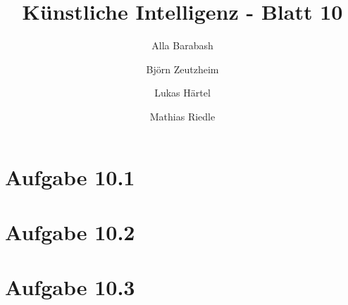 \documentclass[german,a4paper]{scrartcl}
\title{Künstliche Intelligenz - Blatt 10}
\author{Alla Barabash \and Björn Zeutzheim \and Lukas Härtel \and Mathias Riedle}
\date{}
\begin{document}
	\maketitle
	\section*{Aufgabe 10.1}
	
	
	\section*{Aufgabe 10.2}
	
	
	\section*{Aufgabe 10.3}
	
\end{document}
